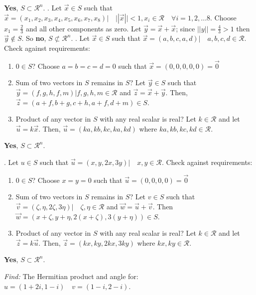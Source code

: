 \documentclass[11pt]{homework}
\begin{document}
\textbf{Yes}, $S \subset \mathcal{R}^n$.
\newline
{}. Let $\vec x \in S$ such that $\vec x=(x_1, x_2, x_3, x_4, x_5, x_6, x_7, x_8)| \quad ||\vec x||<1, x_i \in \mathcal{R} \quad \forall i=1,2,...8$.
Choose $x_1 = \frac{2}{3}$ and all other components as zero. Let $\vec y = \vec x + \vec x$; since $||y|| = \frac{4}{3} > 1$ then $\vec y \not\in S$.
So \textbf{no},  $S \not \subset \mathcal{R}^n$.
\newline
{}. Let $\vec x \in S$ such that $\vec x=(a, b, c, a, d) | \quad a,b,c,d \in \mathcal{R}$.
Check against requirements:
\begin{enumerate}
  \item $0 \in S$? 
        Choose $a=b=c=d=0$ such that $\vec x = ( 0, 0,0,0,0) = \vec 0$
  \item Sum of two vectors in $S$ remains in $S$? 
        Let $\vec y \in S$ such that 
         $\vec y=(f,g, h, f, m)|f,g,h,m \in \mathcal{R}$ and $\vec z = \vec x + \vec y$. 
         Then, $\vec z = ( a+f, b+g, c+h, a+f, d+m) \in S$.
  \item Product of any vector in $S$ with any real scalar is real? 
        Let $k \in \mathcal{R}$ and
         let $\vec u = k\vec x$. Then, $\vec u = ( ka, kb, kc, ka, kd)$ where $ka, kb, kc, kd \in \mathcal{R}$.
\end{enumerate}
\textbf{Yes}, $S \subset \mathcal{R}^n$.

. Let $u \in S$ such that $\vec u = (x, y, 2x, 3y) | \quad x,y\in\mathcal{R}$.
Check against requirements:
\begin{enumerate}
  \item $0 \in S$? 
        Choose $x=y=0$ such that $\vec u = ( 0,0,0,0) = \vec 0$
  \item Sum of two vectors in $S$ remains in $S$? 
        Let $v \in S$ such that 
         $\vec v=(\zeta, \eta, 2\zeta, 3\eta)| \quad \zeta, \eta\in\mathcal{R}$ and $\vec w=\vec u+\vec v$.
         Then $\vec w = (x+\zeta, y+\eta, 2(x+\zeta), 3(y+\eta)) \in S$.
  \item Product of any vector in $S$ with any real scalar is real? 
        Let $k \in \mathcal{R}$ and
         let $\vec z = k\vec u$. Then, $\vec z = ( kx, ky, 2kx, 3ky)$ where $kx, ky\in \mathcal{R}$.
\end{enumerate}
\textbf{Yes}, $S \subset \mathcal{R}^n$.

\emph{Find:}
The Hermitian product and angle for:
\newline
$ u = (1+2i, 1-i) \quad v = (1-i, 2-i)$.
\end{document}
